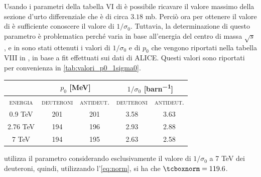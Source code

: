 Usando i parametri della tabella VI di \cite{Dal_2015} è possibile ricavare il valore massimo della sezione d'urto differenziale che è di circa $3.18$ mb.
Perciò ora per ottenere il valore di  è sufficiente conoscere il valore di $1/\sigma_0$.
Tuttavia, la determinazione di questo parametro è problematica perché varia in base all'energia del centro di massa $\sqrt s$, e in \cite{Dal_2015} sono stati ottenuti i valori di $1/\sigma_0$ e di $p_0$ che vengono riportati nella tabella VIII in \cite{Dal_2015}, in base a fit effettuati sui dati di ALICE.
Questi valori sono riportati per convenienza in \autoref{tab:valori_p0_1sigma0}.
\begin{table}[H]
    \centering
    \begin{tabular}{||c||c|c||c|c||}
    \hline \hline
    & \multicolumn{2}{c||}{$p_0$ [\si{MeV}]} & \multicolumn{2}{c||}{$1/\sigma_0$ [\si{barn^{-1}}]}\\
    \hline
    \textsc{energia} & \textsc{deuteroni} & \textsc{antideut.} & \textsc{deuteroni} & \textsc{antideut.} \\ 
    \hline
    0.9 TeV & 201 & 201 & 3.58 & 3.63\\
    2.76 TeV & 194 & 196 & 2.93 & 2.88\\
    7 TeV & 194 & 195 & 2.63 & 2.58\\
    \hline\hline
    \end{tabular}
    \label{tab:valori_p0_1sigma0}
\end{table}
\pythiaa{} utilizza il parametro  considerando esclusivamente il valore di $1/\sigma_0$ a 7 \si{TeV} dei deuteroni, quindi, utilizzando l'\autoref{eq:norm}, si ha che $\ttbox{norm} = 119.6$.